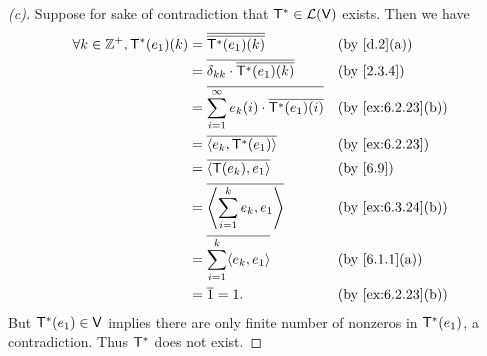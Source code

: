 \begin{proof}[(c)]
  Suppose for sake of contradiction that \(\mathsf{T}^* \in \mathcal{L}(\mathsf{V})\) exists.
  Then we have
  \begin{align*}
    \forall k \in \Z^+, \T^*(e_1)(k) & = \conj{\conj{\T^*(e_1)(k)}}                                  &  & \text{(by \cref{d.2}(a))}       \\
                                     & = \conj{\delta_{k k} \cdot \conj{\T^*(e_1)(k)}}               &  & \text{(by \cref{2.3.4})}        \\
                                     & = \conj{\sum_{i = 1}^\infty e_k(i) \cdot \conj{\T^*(e_1)(i)}} &  & \text{(by \cref{ex:6.2.23}(b))} \\
                                     & = \conj{\inn{e_k, \T^*(e_1)}}                                 &  & \text{(by \cref{ex:6.2.23})}    \\
                                     & = \conj{\inn{\T(e_k), e_1}}                                   &  & \text{(by \cref{6.9})}          \\
                                     & = \conj{\inn{\sum_{i = 1}^k e_k, e_1}}                        &  & \text{(by \cref{ex:6.3.24}(b))} \\
                                     & = \conj{\sum_{i = 1}^k \inn{e_k, e_1}}                        &  & \text{(by \cref{6.1.1}(a))}     \\
                                     & = \conj{1} = 1.                                               &  & \text{(by \cref{ex:6.2.23}(b))}
  \end{align*}
  But \(\mathsf{T}^*(e_1) \in \mathsf{V}\) implies there are only finite number of nonzeros in \(\mathsf{T}^*(e_1)\), a contradiction.
  Thus \(\mathsf{T}^*\) does not exist.
\end{proof}

